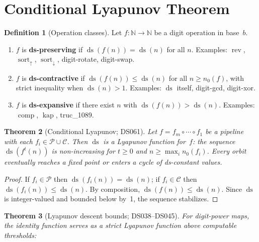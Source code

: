 \documentclass[11pt,a4paper]{amsart}
\theoremstyle{plain}
\newtheorem{theorem}{Theorem}
\theoremstyle{definition}
\newtheorem{definition}[theorem]{Definition}
\theoremstyle{remark}
\DeclareMathOperator{\rev}{rev}
\DeclareMathOperator{\comp}{comp}
\DeclareMathOperator{\sort}{sort}
\DeclareMathOperator{\kap}{kap}
\DeclareMathOperator{\ds}{ds}
\begin{document}
\section{Conditional Lyapunov Theorem}\label{sec:lyapunov}

\begin{definition}[Operation classes]\label{def:op-classes}
Let $f \colon \mathbb{N} \to \mathbb{N}$ be a digit operation in base~$b$.
\begin{enumerate}
\item[\textup{(P)}] $f$ is \textbf{ds-preserving} if $\ds(f(n)) = \ds(n)$
  for all $n$. Examples: $\rev$, $\sort_\uparrow$, $\sort_\downarrow$,
  digit-rotate, digit-swap.
\item[\textup{(C)}] $f$ is \textbf{ds-contractive} if $\ds(f(n)) \leq \ds(n)$
  for all $n \geq n_0(f)$, with strict inequality when $\ds(n) > 1$.
  Examples: $\ds$ itself, digit-gcd, digit-xor.
\item[\textup{(X)}] $f$ is \textbf{ds-expansive} if there exist $n$ with
  $\ds(f(n)) > \ds(n)$. Examples: $\comp$, $\kap$, truc\_1089.
\end{enumerate}
\end{definition}

\begin{theorem}[Conditional Lyapunov; DS061]\label{thm:lyapunov-cond}
Let $f = f_m \circ \cdots \circ f_1$ be a pipeline with each
$f_i \in \mathcal{P} \cup \mathcal{C}$. Then $\ds$ is a Lyapunov function
for~$f$: the sequence $\ds(f^t(n))$ is non-increasing for $t \geq 0$ and
$n \geq \max_i n_0(f_i)$. Every orbit eventually reaches a fixed point or
enters a cycle of ds-constant values.
\end{theorem}

\begin{proof}
If $f_i \in \mathcal{P}$ then $\ds(f_i(n)) = \ds(n)$; if
$f_i \in \mathcal{C}$ then $\ds(f_i(n)) \leq \ds(n)$. By composition,
$\ds(f(n)) \leq \ds(n)$. Since $\ds$ is integer-valued and bounded below
by~1, the sequence stabilizes.
\end{proof}

\begin{theorem}[Lyapunov descent bounds; DS038--DS045]\label{thm:descent}
For digit-power maps, the identity function serves as a strict Lyapunov
function above computable thresholds:
\end{theorem}
\end{document}
